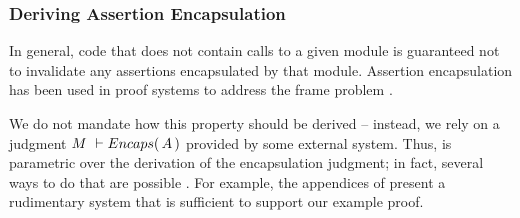%

\subsubsection{Deriving  Assertion Encapsulation}

{In general},  code that does not contain 
calls to a {given} module is guaranteed not to invalidate any assertions encapsulated by that module.
 Assertion encapsulation has been used in proof systems to {address}   the  {frame} problem
 \cite{objInvars,encaps}. 

We  do not mandate how this property should be derived -- instead, we rely on a judgment 
$M\ \vdash  \encaps{A}$ provided by some external system. 
Thus, \SpecLang is parametric over the derivation of the encapsulation
     judgment; in fact, several ways to do that are possible \cite{TAME2003,ownEncaps,objInvars}. For example,
 the appendices of
    \cite{necessityFull} present a 
    rudimentary system that is sufficient to support our example
    proof.  



